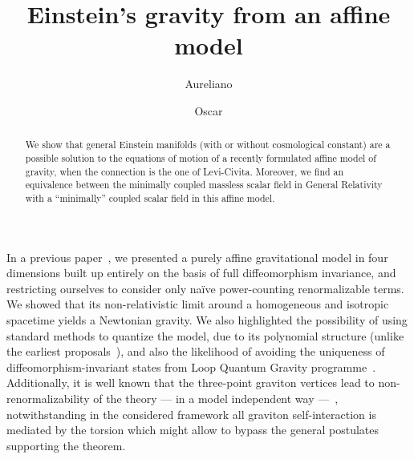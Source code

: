 \documentclass[aps,prl,twocolumn,superscriptaddress,showpacs,showkeys]{revtex4-1}
\begin{document}
\title{Einstein's gravity from an affine model}


\author{Aureliano }

\author{Oscar }

\begin{abstract}
  We show that general Einstein manifolds (with or without cosmological constant) are a possible solution to the equations of motion of a recently formulated affine model of gravity, when the connection is the one of Levi-Civita. Moreover, we find an equivalence between the minimally coupled massless scalar field in General Relativity with a ``minimally'' coupled scalar field in this affine model.
\end{abstract}



\maketitle

In a previous paper~\cite{Skirzewski:2014eta}, we presented a purely affine gravitational model in four dimensions built up entirely on the basis of full diffeomorphism invariance, and restricting ourselves to consider only na\"ive power-counting renormalizable terms. We showed that its non-relativistic limit around a homogeneous and isotropic spacetime yields a Newtonian gravity. We also highlighted the possibility of using standard methods to quantize the model, due to its polynomial structure (unlike the earliest proposals~\cite{Eddington1923math,schrodinger1950space}), and also the likelihood of avoiding the uniqueness of diffeomorphism-invariant states from Loop Quantum Gravity programme~\cite{Lewandowski:2005jk}. Additionally, it is well known that the three-point graviton vertices lead to non-renormalizability of the theory --- in a model independent way ---~\cite{McGady:2013sga,Camanho:2014apa}, notwithstanding in the considered framework all graviton self-interaction is mediated by the torsion which might allow to bypass the general postulates supporting the theorem.
\end{document}
